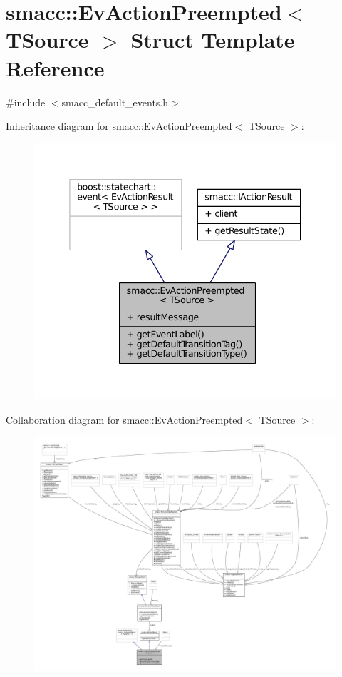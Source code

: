 \hypertarget{structsmacc_1_1EvActionPreempted}{}\section{smacc\+:\+:Ev\+Action\+Preempted$<$ T\+Source $>$ Struct Template Reference}
\label{structsmacc_1_1EvActionPreempted}


{\ttfamily \#include $<$smacc\+\_\+default\+\_\+events.\+h$>$}



Inheritance diagram for smacc\+:\+:Ev\+Action\+Preempted$<$ T\+Source $>$\+:
\nopagebreak
\begin{figure}[H]
\begin{center}
\leavevmode
\includegraphics[width=338pt]{structsmacc_1_1EvActionPreempted__inherit__graph}
\end{center}
\end{figure}


Collaboration diagram for smacc\+:\+:Ev\+Action\+Preempted$<$ T\+Source $>$\+:
\nopagebreak
\begin{figure}[H]
\begin{center}
\leavevmode
\includegraphics[width=350pt]{structsmacc_1_1EvActionPreempted__coll__graph}
\end{center}
\end{figure}
